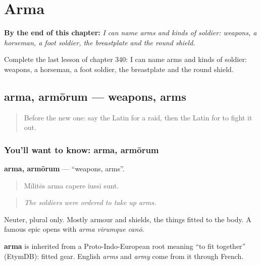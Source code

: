 
\chapter{Arma}
\label{ch:la-arma}

\begin{chapteropening}
\textbf{By the end of this chapter:} \emph{I can name arms and kinds of soldier: weapons, a horseman, a foot soldier, the breastplate and the round shield.}

Complete the last lesson of chapter 340: I can name arms and kinds of soldier: weapons, a horseman, a foot soldier, the breastplate and the round shield.
\end{chapteropening}

\section[arma, armōrum]{arma, armōrum — weapons, arms}

\label{lesson:LA-C340-arma}



\begin{quote}
Before the new one: say the Latin for a raid, then the Latin for to fight it out.
\end{quote}

\subsection*{You'll want to know: arma, armōrum}
\textbf{arma, armōrum} — \textquotedblleft{}weapons, arms\textquotedblright{}.

\begin{quote}
Mīlitēs arma capere iussī sunt.
\end{quote}

\begin{quote}
\emph{The soldiers were ordered to take up arms.}
\end{quote}

Neuter, plural only. Mostly armour and shields, the things fitted to the body. A famous epic opens with \emph{arma virumque canō}.

\begin{cousinweb}
\textbf{arma} is inherited from a Proto-Indo-European root meaning \textquotedblleft{}to fit together\textquotedblright{} (EtymDB): fitted gear. English \emph{arms} and \emph{army} come from it through French.
\end{cousinweb}

